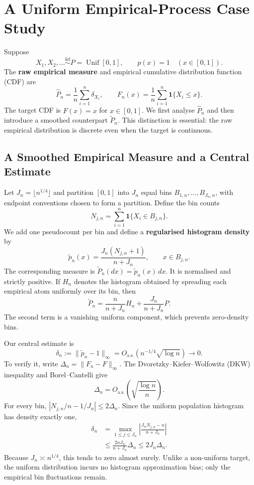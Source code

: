 \documentclass[
  11pt,
  a4paper,
  notitlepage
]{report}
\begin{document}
\chapter{A Uniform Empirical-Process Case
Study}\label{a-uniform-empirical-process-case-study}

Suppose \[
X_1,X_2,\ldots\overset{\mathrm{iid}}{\sim}P=\operatorname{Unif}[0,1],
\qquad p(x)=1\quad (x\in[0,1]).
\] The \textbf{raw empirical measure} and empirical cumulative
distribution function (CDF) are \[
\widehat P_n=\frac1n\sum_{i=1}^n\delta_{X_i},
\qquad
F_n(x)=\frac1n\sum_{i=1}^n\mathbf1\{X_i\le x\}.
\] The target CDF is \(F(x)=x\) for \(x\in[0,1]\). We first analyse
\(\widehat P_n\) and then introduce a smoothed counterpart
\(\widetilde P_n\). This distinction is essential: the raw empirical
distribution is discrete even when the target is continuous.

\section{A Smoothed Empirical Measure and a Central
Estimate}\label{a-smoothed-empirical-measure-and-a-central-estimate}

Let \(J_n=\lfloor n^{1/4}\rfloor\) and partition \([0,1]\) into \(J_n\)
equal bins \(B_{1,n},\ldots,B_{J_n,n}\), with endpoint conventions
chosen to form a partition. Define the bin counts \[
N_{j,n}=\sum_{i=1}^n\mathbf1\{X_i\in B_{j,n}\}.
\] We add one pseudocount per bin and define a \textbf{regularised
histogram density} by \[
\boxed{
\widetilde p_n(x)=\frac{J_n(N_{j,n}+1)}{n+J_n},
\qquad x\in B_{j,n}.
}
\] The corresponding measure is
\(\widetilde P_n(dx)=\widetilde p_n(x)\,dx\). It is normalised and
strictly positive. If \(H_n\) denotes the histogram obtained by
spreading each empirical atom uniformly over its bin, then \[
\widetilde P_n=\frac{n}{n+J_n}H_n
+\frac{J_n}{n+J_n}P.
\] The second term is a vanishing uniform component, which prevents
zero-density bins.

Our central estimate is \[
\boxed{\delta_n:=\|\widetilde p_n-1\|_\infty
=O_{\mathrm{a.s.}}\!\left(n^{-1/4}\sqrt{\log n}\right)\longrightarrow0.}
\] To verify it, write \(\Delta_n=\|F_n-F\|_\infty\). The
Dvoretzky--Kiefer--Wolfowitz (DKW) inequality and Borel--Cantelli give
\[
\Delta_n=O_{\mathrm{a.s.}}\!\left(\sqrt{\frac{\log n}{n}}\right).
\] For every bin, \(|N_{j,n}/n-1/J_n|\le2\Delta_n\). Since the uniform
population histogram has density exactly one, \[
\begin{aligned}
\delta_n
&=\max_{1\le j\le J_n}
\left|\frac{J_nN_{j,n}-n}{n+J_n}\right|\\
&\le\frac{2nJ_n}{n+J_n}\Delta_n
\le2J_n\Delta_n.
\end{aligned}
\] Because \(J_n\asymp n^{1/4}\), this tends to zero almost surely.
Unlike a non-uniform target, the uniform distribution incurs no
histogram approximation bias; only the empirical bin fluctuations
remain.
\end{document}
